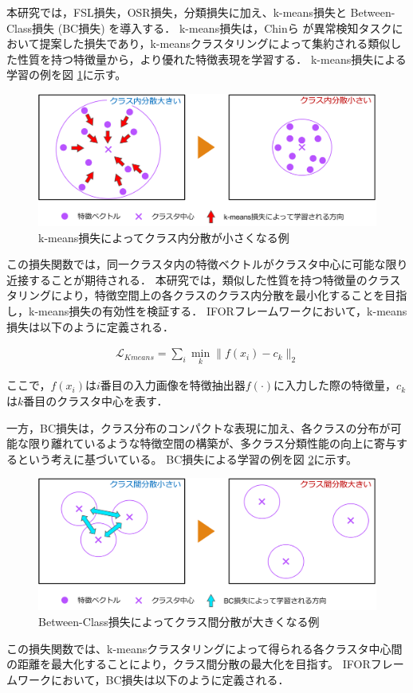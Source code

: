 \documentclass[a4paper,11pt,nomag]{jsreport}
\begin{document}
本研究では，FSL損失，OSR損失，分類損失に加え、k-means損失と Between-Class損失 (BC損失) を導入する．
k-means損失は，Chinら \cite{k-means}が異常検知タスクにおいて提案した損失であり，k-meansクラスタリングによって集約される類似した性質を持つ特徴量から，より優れた特徴表現を学習する．
k-means損失による学習の例を図 \ref{fig:kmeans_loss}に示す。
% 
\begin{figure}[tbp]
  \centering
  \includegraphics[width=\linewidth, keepaspectratio]{image/kmeans_loss.png}
  \caption{k-means損失によってクラス内分散が小さくなる例}
  \label{fig:kmeans_loss}
\end{figure}
% 
この損失関数では，同一クラスタ内の特徴ベクトルがクラスタ中心に可能な限り近接することが期待される．
本研究では，類似した性質を持つ特徴量のクラスタリングにより，特徴空間上の各クラスのクラス内分散を最小化することを目指し，k-means損失の有効性を検証する．
IFORフレームワークにおいて，k-means損失は以下のように定義される．

\begin{align}
\mathcal{L}_{Kmeans} = \sum_i{\min_k \lVert f(x_i)-c_k \rVert_2}
\end{align}

\noindent
ここで，$f(x_i)$は$i$番目の入力画像を特徴抽出器$f(\cdot)$に入力した際の特徴量，$c_k$は$k$番目のクラスタ中心を表す．

一方，BC損失は，クラス分布のコンパクトな表現に加え、各クラスの分布が可能な限り離れているような特徴空間の構築が、多クラス分類性能の向上に寄与するという考えに基づいている。
BC損失による学習の例を図 \ref{fig:bc_loss}に示す。
% 
\begin{figure}[tbp]
  \centering
  \includegraphics[width=\linewidth, keepaspectratio]{image/bc_loss.png}
  \caption{Between-Class損失によってクラス間分散が大きくなる例}
  \label{fig:bc_loss}
\end{figure}
%
この損失関数では、k-meansクラスタリングによって得られる各クラスタ中心間の距離を最大化することにより，クラス間分散の最大化を目指す。
IFORフレームワークにおいて，BC損失は以下のように定義される．
\end{document}
